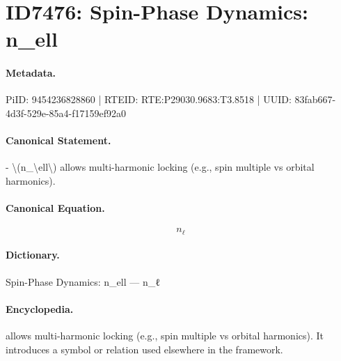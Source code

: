 \section*{ID7476: Spin-Phase Dynamics: n\_ell}
\paragraph{Metadata.}
PiID: 9454236828860 | RTEID: RTE:P29030.9683:T3.8518 | UUID: 83fab667-4d3f-529e-85a4-f17159ef92a0

\paragraph{Canonical Statement.}
- \textbackslash{}(n\_\textbackslash{}ell\textbackslash{}) allows multi-harmonic locking (e.g., spin multiple vs orbital harmonics).

\paragraph{Canonical Equation.}
\[
n_\ell
\]

\paragraph{Dictionary.}
Spin-Phase Dynamics: n\_ell — n\_ℓ

\paragraph{Encyclopedia.}
allows multi-harmonic locking (e.g., spin multiple vs orbital harmonics). It introduces a symbol or relation used elsewhere in the framework.
